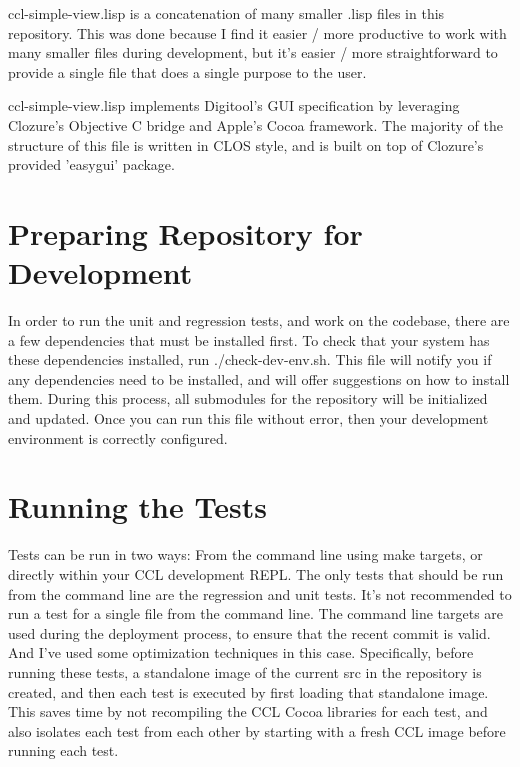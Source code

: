 \documentclass[12pt]{article} %
\begin{document}
ccl-simple-view.lisp is a concatenation of many smaller .lisp files in this repository.
This was done because I find it easier / more productive to work with many smaller files during development, but it's easier / more straightforward to provide a single file that does a single purpose to the user. 

ccl-simple-view.lisp implements Digitool's GUI specification by leveraging Clozure's Objective C bridge and Apple's Cocoa framework.
The majority of the structure of this file is written in CLOS style, and is built on top of Clozure's provided 'easygui' package. 

\section{Preparing Repository for Development}

In order to run the unit and regression tests, and work on the codebase, there are a few dependencies that must be installed first.
To check that your system has these dependencies installed, run ./check-dev-env.sh.
This file will notify you if any dependencies need to be installed, and will offer suggestions on how to install them.
During this process, all submodules for the repository will be initialized and updated.
Once you can run this file without error, then your development environment is correctly configured.

\section{Running the Tests}

Tests can be run in two ways: From the command line using make targets, or directly within your CCL development REPL.
The only tests that should be run from the command line are the regression and unit tests.
It's not recommended to run a test for a single file from the command line.
The command line targets are used during the deployment process, to ensure that the recent commit is valid.
And I've used some optimization techniques in this case.
Specifically, before running these tests, a standalone image of the current src in the repository is created, and then each test is executed by first loading that standalone image.
This saves time by not recompiling the CCL Cocoa libraries for each test, and also isolates each test from each other by starting with a fresh CCL image before running each test.
\end{document}
